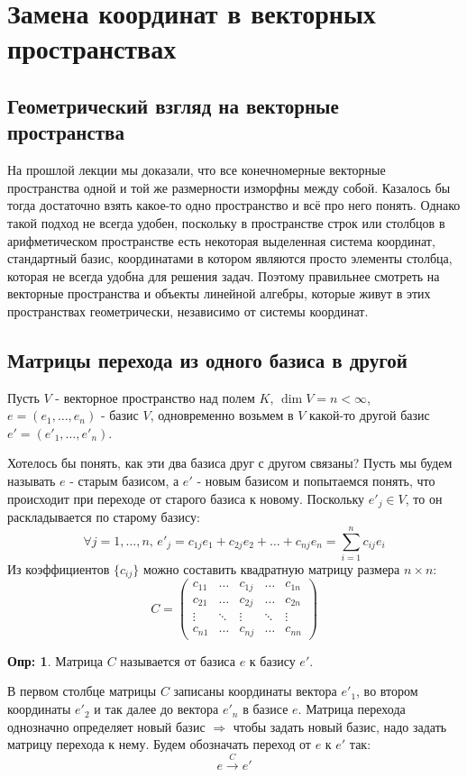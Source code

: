 \documentclass[12pt]{article}
\theoremstyle{definition}
\newtheorem{defn}{Опр:}
\newcommand{\ddsum}[2]{\displaystyle\sum\limits_{#1}^{#2}}
\begin{document}
\section*{Замена координат в векторных пространствах}
\subsection*{Геометрический взгляд на векторные пространства}
На прошлой лекции мы доказали, что все конечномерные векторные пространства одной и той же размерности изморфны между собой. Казалось бы тогда достаточно взять какое-то одно пространство и всё про него понять. Однако такой подход не всегда удобен, поскольку в пространстве строк или столбцов в арифметическом пространстве есть некоторая выделенная система координат, стандартный базис, координатами в котором являются просто элементы столбца, которая не всегда удобна для решения задач. Поэтому правильнее смотреть на векторные пространства и объекты линейной алгебры, которые живут в этих пространствах геометрически, независимо от системы координат.

\subsection*{Матрицы перехода из одного базиса в другой}
Пусть $V$ - векторное пространство над полем $K$, $\dim{V} = n < \infty$, $e = (e_1, \dotsc, e_n)$ - базис $V$, одновременно возьмем в $V$ какой-то другой базис $e' = (e'_1, \dotsc, e'_n)$. 

Хотелось бы понять, как эти два базиса друг с другом связаны? Пусть мы будем называть $e$ - старым базисом, а $e'$ - новым базисом и попытаемся понять, что происходит при переходе от старого базиса к новому. Поскольку $e'_j \in V$, то он раскладывается по старому базису:
$$
	\forall j = 1, \dotsc, n, \, e'_j = c_{1j}e_1 + c_{2j}e_2 + \dotsc + c_{nj}e_n = \ddsum{i = 1}{n}c_{ij}e_i
$$
Из коэффициентов $\{c_{ij}\}$ можно составить квадратную матрицу размера $n \times n$:
$$
	C = 
	\begin{pmatrix}
		c_{11} & \dotsc & c_{1j} & \dotsc  & c_{1n} \\
		c_{21} & \dotsc & c_{2j} & \dotsc & c_{2n}\\
		\vdots & \ddots & \vdots & \ddots & \vdots\\
		c_{n1} & \dotsc & c_{nj} & \dotsc & c_{nn}
	\end{pmatrix}
$$
\begin{defn}
	Матрица $C$ называется  от базиса $e$ к базису $e'$. 
\end{defn}
В первом столбце матрицы $C$ записаны координаты вектора $e'_1$, во втором координаты $e'_2$ и так далее до вектора $e'_n$ в базисе $e$. Матрица перехода однозначно определяет новый базис $\Rightarrow$ чтобы задать новый базис, надо задать матрицу перехода к нему. Будем обозначать переход от $e$ к $e'$ так: 
$$
	e \xrightarrow[]{C}e'
$$
\end{document}
